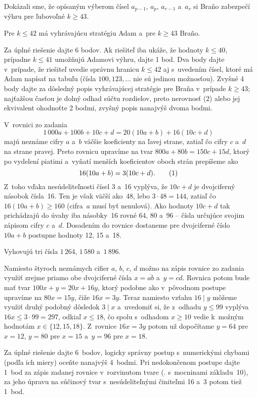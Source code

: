 {Dokázali sme, že opísaným výberom čísel $a_{p-1}$, $a_p$, $a_{r-1}$ a~$a_r$ si Braňo
zabezpečí výhru pre ľubovoľné $k\ge 43$.

\odpoved
Pre $k\le 42$ má vyhrávajúcu stratégiu Adam a~pre $k\ge 43$ Braňo.

\nobreak\medskip\petit\noindent
Za úplné riešenie dajte 6 bodov.
Ak riešiteľ iba ukáže, že hodnoty $k\le 40$, prípadne $k\le 41$
umožňujú Adamovi výhru, dajte 1 bod. Dva body dajte v~prípade, že riešiteľ uvedie
správnu hranicu $k\le 42$ aj s~uvedením čísel, ktoré má Adam napísať na
tabuľu (čísla $100, 123,\dots$ nie sú jedinou možnosťou).
Zvyšné 4 body dajte za dôsledný popis vyhrávajúcej stratégie pre
Braňa v~prípade $k\ge 43$; najťažšou časťou je dolný odhad súčtu
rozdielov, preto nerovnosť (2) alebo jej ekvivalent ohodnoťte 2
bodmi, zvyšný popis nanajvýš dvoma bodmi.
\endpetit
}

{%
V~rovnici zo zadania
$$
1\,000a+100b+10c+d=20(10a+b)+16(10c+d)
$$
majú neznáme cifry $a$ a~$b$ väčšie koeficienty na ľavej strane,
zatiaľ čo cifry $c$ a~$d$ na strane pravej. Preto rovnicu upravíme
na tvar $800a+80b=150c+15d$, ktorý po vydelení piatimi a~vyňatí
menších koeficientov oboch strán prepíšeme ako
$$
16(10a+b)={3(10c+d)}.
\tag1
$$
Z~toho vďaka nesúdeliteľnosti čísel 3 a~16 vyplýva, že $10c+d$ je dvojciferný
násobok čísla~16. Ten je však väčší ako~48, lebo $3\cdot48=144$,
zatiaľ čo $16(10a+b)\ge160$ (cifra~$a$ musí byť nenulová).
Ako hodnoty $10c+d$ tak prichádzajú do úvahy iba násobky~16
rovné 64, 80 a~96 -- čísla určujúce svojim zápisom cifry $c$ a~$d$.
Dosadením do rovnice  dostaneme pre dvojciferné číslo $10a+b$
postupne hodnoty 12, 15 a~18.

\odpoved
Vyhovujú tri čísla $1\,264$, $1\,580$ a~$1\,896$.

\poznamka
Namiesto štyroch neznámych cifier $a$, $b$, $c$, $d$
možno na zápis rovnice zo zadania využiť zrejme priamo
obe dvojciferné čísla $x=\overline{ab}$ a~$y=\overline{cd}$. Rovnica potom bude mať tvar
$100x+y=20x+16y$, ktorý podobne ako v~pôvodnom postupe
upravíme na $80x=15y$, čiže $16x=3y$. Teraz namiesto vzťahu
$16\mid y$ môžeme využiť druhý podobný dôsledok $3\mid x$ a~uvedomiť si,
že z~odhadu $y\le99$ vyplýva $16x\le3\cdot99=297$, odkiaľ
$x\le18$, čo spolu s~odhadom $x\ge10$ vedie k~možným hodnotám
$x\in\{12,15,18\}$. Z~rovnice $16x=3y$ potom už
dopočítame $y=64$ pre $x=12$, $y=80$ pre $x=15$ a~$y=96$ pre $x=18$.

\nobreak\medskip\petit\noindent
Za úplné riešenie dajte 6~bodov, logicky správny postup
s~numerickými chybami (podľa ich miery) oceňte nanajvýš 4~bodmi.
Pri nedokončenom postupe dajte 1~bod za zápis zadanej rovnice
v~rozvinutom tvare (\tj. s~mocninami základu~10), za jeho úpravu
na súčinový tvar s~nesúdeliteľnými činiteľmi 16 a~3 potom tiež 1~bod.

\endpetit
\bigbreak}

